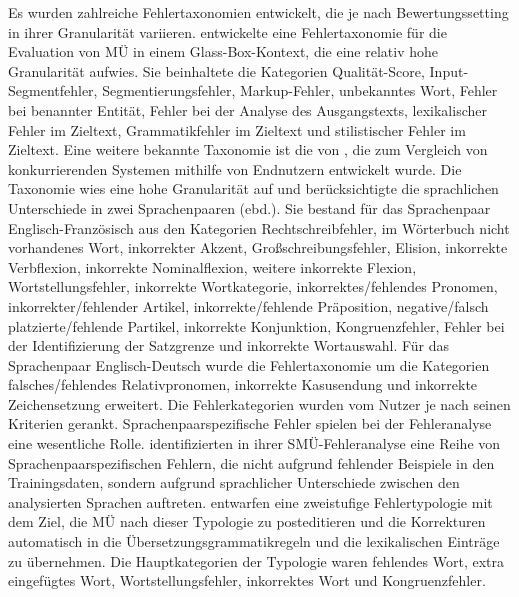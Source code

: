 Es wurden zahlreiche Fehlertaxonomien entwickelt, die je nach Bewertungssetting in ihrer Granularität variieren. \citet{Correa2003} entwickelte eine Fehlertaxonomie für die Evaluation von MÜ in einem Glass-Box-Kontext, die eine relativ hohe Granularität aufwies. Sie beinhaltete die Kategorien Qualität-Score, Input-Segmentfehler, Segmentierungsfehler, Markup-Fehler, unbekanntes Wort, Fehler bei benannter Entität, Fehler bei der Analyse des Ausgangstexts, lexikalischer Fehler im Zieltext, Grammatikfehler im Zieltext und stilistischer Fehler im Zieltext. Eine weitere bekannte Taxonomie ist die von \citet{Flanagan1994}, die zum Vergleich von konkurrierenden Systemen mithilfe von Endnutzern entwickelt wurde. Die Taxonomie wies eine hohe Granularität auf und berücksichtigte die sprachlichen Unterschiede in zwei Sprachenpaaren (ebd.). Sie bestand für das Sprachenpaar Englisch-Französisch aus den Kategorien Rechtschreibfehler, im Wörterbuch nicht vorhandenes Wort, inkorrekter Akzent, Großschreibungsfehler, Elision, inkorrekte Verbflexion, inkorrekte Nominalflexion, weitere inkorrekte Flexion, Wortstellungsfehler, inkorrekte Wortkategorie, inkorrektes/fehlendes Pronomen, inkorrekter/fehlender Artikel, inkorrekte/fehlende Präposition, negative/falsch platzierte/fehlende Partikel, inkorrekte Konjunktion, Kongruenzfehler, Fehler bei der Identifizierung der Satzgrenze und inkorrekte Wortauswahl. Für das Sprachenpaar Englisch-Deutsch wurde die Fehlertaxonomie um die Kategorien falsches/fehlendes Relativpronomen, inkorrekte Kasusendung und inkorrekte Zeichensetzung erweitert. Die Fehlerkategorien wurden vom Nutzer je nach seinen Kriterien gerankt. Sprachenpaarspezifische Fehler spielen bei der Fehleranalyse eine wesentliche Rolle. \citet{CondonEtAl2010} identifizierten in ihrer SMÜ-Fehleranalyse eine Reihe von Sprachenpaarspezifischen Fehlern, die nicht aufgrund fehlender Beispiele in den Trainingsdaten, sondern aufgrund sprachlicher Unterschiede zwischen den analysierten Sprachen auftreten. \citet{LlitjósEtAl2005} entwarfen eine zweistufige Fehlertypologie mit dem Ziel, die MÜ nach dieser Typologie zu posteditieren und die Korrekturen automatisch in die Übersetzungsgrammatikregeln und die lexikalischen Einträge zu übernehmen. Die Hauptkategorien der Typologie waren fehlendes Wort, extra eingefügtes Wort, Wortstellungsfehler, inkorrektes Wort und Kongruenzfehler.


